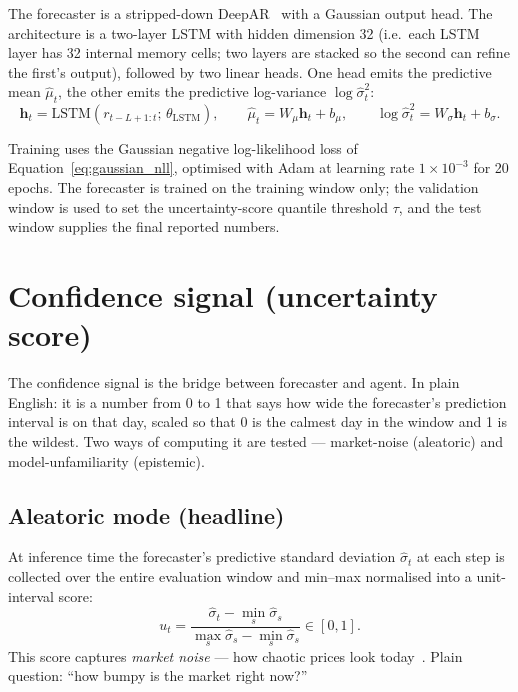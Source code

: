 The forecaster is a stripped-down DeepAR~\parencite{salinas2020deepar} with a Gaussian output head. The architecture is a two-layer LSTM with hidden dimension 32 (i.e.\ each LSTM layer has 32 internal memory cells; two layers are stacked so the second can refine the first's output), followed by two linear heads. One head emits the predictive mean $\hat{\mu}_t$, the other emits the predictive log-variance $\log \hat{\sigma}_t^2$:
\begin{equation}
  \label{eq:lstm_heads}
  \mathbf{h}_t = \mathrm{LSTM}(r_{t-L+1:t}; \, \theta_{\mathrm{LSTM}}), \qquad
  \hat{\mu}_t = W_\mu \mathbf{h}_t + b_\mu, \qquad
  \log \hat{\sigma}_t^2 = W_\sigma \mathbf{h}_t + b_\sigma.
\end{equation}

Training uses the Gaussian negative log-likelihood loss of Equation~\ref{eq:gaussian_nll}, optimised with Adam at learning rate $1 \times 10^{-3}$ for 20 epochs. The forecaster is trained on the training window only; the validation window is used to set the uncertainty-score quantile threshold $\tau$, and the test window supplies the final reported numbers.

\section{Confidence signal (uncertainty score)}
\label{sec:uncertainty_score}

The confidence signal is the bridge between forecaster and agent. In plain English: it is a number from 0 to 1 that says how wide the forecaster's prediction interval is on that day, scaled so that 0 is the calmest day in the window and 1 is the wildest. Two ways of computing it are tested --- market-noise (aleatoric) and model-unfamiliarity (epistemic).

\subsection{Aleatoric mode (headline)}
\label{sec:aleatoric_mode}

At inference time the forecaster's predictive standard deviation $\hat{\sigma}_t$ at each step is collected over the entire evaluation window and min--max normalised into a unit-interval score:
\begin{equation}
  \label{eq:uncertainty_score}
  u_t = \frac{\hat{\sigma}_t - \min_s \hat{\sigma}_s}{\max_s \hat{\sigma}_s - \min_s \hat{\sigma}_s} \in [0, 1].
\end{equation}
This score captures \emph{market noise} --- how chaotic prices look today~\parencite{kendall2017uncertainties}. Plain question: ``how bumpy is the market right now?''

